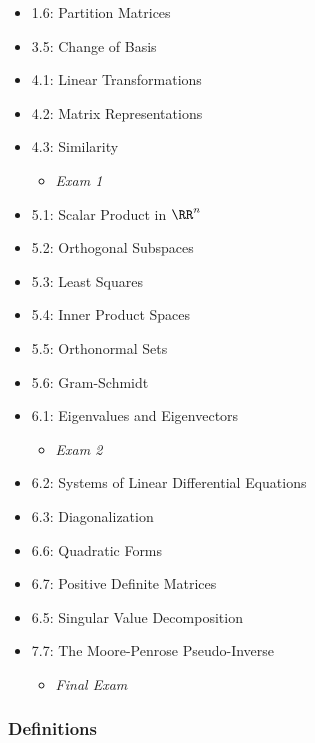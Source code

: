 \begin{itemize}
\tightlist
\item
  1.6: Partition Matrices
\item
  3.5: Change of Basis
\item
  4.1: Linear Transformations
\item
  4.2: Matrix Representations
\item
  4.3: Similarity

  \begin{itemize}
  \tightlist
  \item
    \emph{Exam 1}\\
  \end{itemize}
\item
  5.1: Scalar Product in \(\RR^n\)
\item
  5.2: Orthogonal Subspaces
\item
  5.3: Least Squares
\item
  5.4: Inner Product Spaces
\item
  5.5: Orthonormal Sets
\item
  5.6: Gram-Schmidt
\item
  6.1: Eigenvalues and Eigenvectors

  \begin{itemize}
  \tightlist
  \item
    \emph{Exam 2}
  \end{itemize}
\item
  6.2: Systems of Linear Differential Equations
\item
  6.3: Diagonalization
\item
  6.6: Quadratic Forms
\item
  6.7: Positive Definite Matrices
\item
  6.5: Singular Value Decomposition
\item
  7.7: The Moore-Penrose Pseudo-Inverse

  \begin{itemize}
  \tightlist
  \item
    \emph{Final Exam}
  \end{itemize}
\end{itemize}

\hypertarget{definitions}{%
\subsubsection{Definitions}\label{definitions}}

